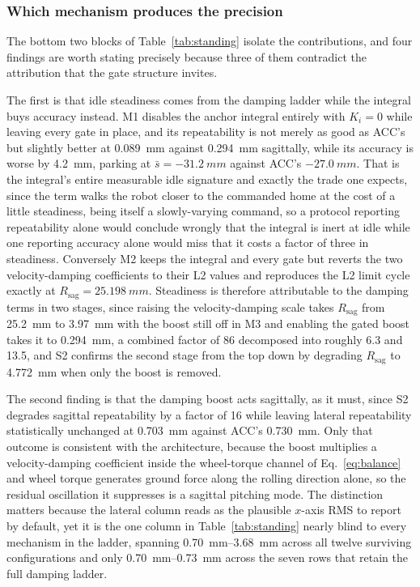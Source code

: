 \documentclass[a4paper,fleqn]{cas-dc}
\begin{document}
\subsubsection{Which mechanism produces the precision}
\label{sec:idle_mechanism}

The bottom two blocks of Table~\ref{tab:standing} isolate the contributions, and
four findings are worth stating precisely because three of them contradict the
attribution that the gate structure invites.

The first is that idle steadiness comes from the damping ladder while the
integral buys accuracy instead. M1 disables the anchor integral entirely with
$K_i{=}0$ while leaving every gate in place, and its repeatability is not merely
as good as ACC's but slightly better at \SI{0.089}{mm} against \SI{0.294}{mm}
sagittally, while its accuracy is worse by \SI{4.2}{mm}, parking at
$\bar{s}={-}\SI{31.2}{mm}$ against ACC's $-\SI{27.0}{mm}$. That is the integral's
entire measurable idle signature and exactly the trade one expects, since the
term walks the robot closer to the commanded home at the cost of a little
steadiness, being itself a slowly-varying command, so a protocol reporting
repeatability alone would conclude wrongly that the integral is inert at idle
while one reporting accuracy alone would miss that it costs a factor of three in
steadiness. Conversely M2 keeps the integral and every gate but reverts the two
velocity-damping coefficients to their L2 values and reproduces the L2 limit
cycle exactly at $R_{\text{sag}}{=}\SI{25.198}{mm}$. Steadiness is therefore
attributable to the damping terms in two stages, since raising the
velocity-damping scale takes $R_{\text{sag}}$ from \SI{25.2}{mm} to \SI{3.97}{mm}
with the boost still off in M3 and enabling the gated boost takes it to
\SI{0.294}{mm}, a combined factor of \num{86} decomposed into roughly \num{6.3}
and \num{13.5}, and S2 confirms the second stage from the top down by degrading
$R_{\text{sag}}$ to \SI{4.772}{mm} when only the boost is removed.

The second finding is that the damping boost acts sagittally, as it must, since
S2 degrades sagittal repeatability by a factor of \num{16} while leaving lateral
repeatability statistically unchanged at \SI{0.703}{mm} against ACC's
\SI{0.730}{mm}. Only that outcome is consistent with the architecture, because
the boost multiplies a velocity-damping coefficient inside the wheel-torque
channel of Eq.~\eqref{eq:balance} and wheel torque generates ground force along
the rolling direction alone, so the residual oscillation it suppresses is a
sagittal pitching mode. The distinction matters because the lateral column reads
as the plausible $x$-axis RMS to report by default, yet it is the one column in
Table~\ref{tab:standing} nearly blind to every mechanism in the ladder, spanning
\SIrange{0.70}{3.68}{mm} across all twelve surviving configurations and only
\SIrange{0.70}{0.73}{mm} across the seven rows that retain the full damping
ladder.
\end{document}
